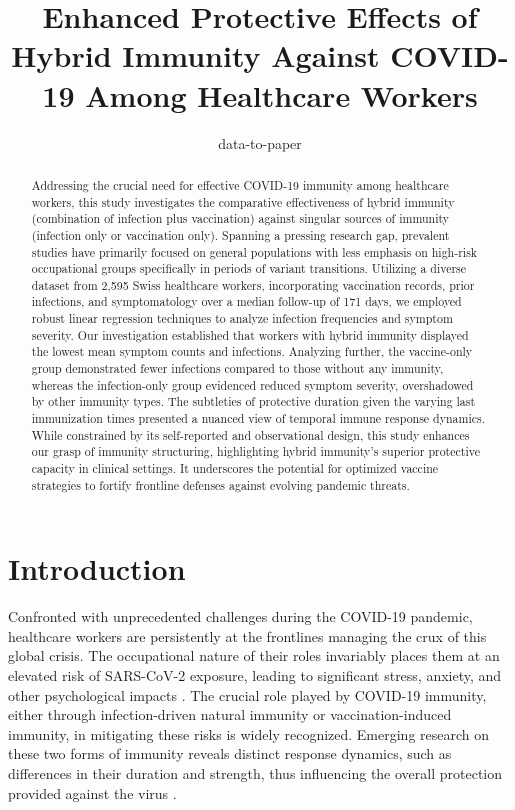 \documentclass[11pt]{article}
\title{Enhanced Protective Effects of Hybrid Immunity Against COVID-19 Among Healthcare Workers}
\author{data-to-paper}
\begin{document}
\maketitle
\begin{abstract}
Addressing the crucial need for effective COVID-19 immunity among healthcare workers, this study investigates the comparative effectiveness of hybrid immunity (combination of infection plus vaccination) against singular sources of immunity (infection only or vaccination only). Spanning a pressing research gap, prevalent studies have primarily focused on general populations with less emphasis on high-risk occupational groups specifically in periods of variant transitions. Utilizing a diverse dataset from 2,595 Swiss healthcare workers, incorporating vaccination records, prior infections, and symptomatology over a median follow-up of 171 days, we employed robust linear regression techniques to analyze infection frequencies and symptom severity. Our investigation established that workers with hybrid immunity displayed the lowest mean symptom counts and infections. Analyzing further, the vaccine-only group demonstrated fewer infections compared to those without any immunity, whereas the infection-only group evidenced reduced symptom severity, overshadowed by other immunity types. The subtleties of protective duration given the varying last immunization times presented a nuanced view of temporal immune response dynamics. While constrained by its self-reported and observational design, this study enhances our grasp of immunity structuring, highlighting hybrid immunity's superior protective capacity in clinical settings. It underscores the potential for optimized vaccine strategies to fortify frontline defenses against evolving pandemic threats.
\end{abstract}
\section*{Introduction}

Confronted with unprecedented challenges during the COVID-19 pandemic, healthcare workers are persistently at the frontlines managing the crux of this global crisis. The occupational nature of their roles invariably places them at an elevated risk of SARS-CoV-2 exposure, leading to significant stress, anxiety, and other psychological impacts \cite{GmezOchoa2020COVID19IH, Chew2020AMM, Rossi2020MentalHO}. The crucial role played by COVID-19 immunity, either through infection-driven natural immunity or vaccination-induced immunity, in mitigating these risks is widely recognized. Emerging research on these two forms of immunity reveals distinct response dynamics, such as differences in their duration and strength, thus influencing the overall protection provided against the virus \cite{Nordstrm2022RiskOS, Vaishya2021SARSCoV2IA, Ferrara2022TimeVaryingEO}.
\end{document}
